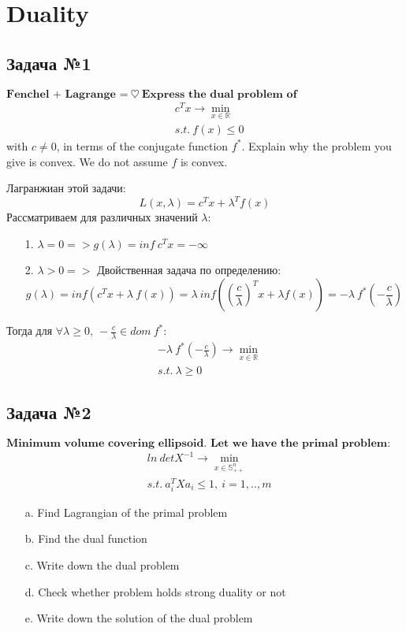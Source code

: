 \documentclass[12pt,letterpaper]{article}
\begin{document}
\newpage
\section{Duality}
\subsection*{Задача №1}
$\textbf{Fenchel + Lagrange =}\  \heartsuit\ \textbf{Express the dual problem of}$ 
$$\begin{aligned}
&c^Tx \rightarrow \min _{x \in \mathbb{R}} \\
&s.t.\ f(x) \leq 0
\end{aligned} $$
with \(c \neq 0\), in terms of the conjugate function \(f^*\). Explain why the problem you give is convex. We do not assume \(f\) is convex.

Лагранжиан этой задачи:
$$L(x,\lambda)=c^Tx+{\lambda}^Tf(x)$$
Рассматриваем для различных значений $\lambda:$
\begin{itemize}
	\item[1.] $\lambda=0 => g(\lambda)=inf\ c^Tx=-\infty$
	\item[2.] $\lambda>0 =>$ Двойственная задача по определению: 
	$$g(\lambda)=inf(c^Tx+\lambda\ f(x))=\lambda\ inf ({(\frac{c}{\lambda})}^Tx+\lambda f(x))=-\lambda\ f^*(-\frac{c}{\lambda})$$
\end{itemize}
Тогда для $\forall\lambda\geqslant0,\ -\frac{c}{\lambda}\in dom\ f^*:$
$$\begin{aligned}
&-\lambda\ f^*(-\frac{c}{\lambda}) \rightarrow \min _{x \in \mathbb{R}} \\
&s.t.\ \lambda\geqslant0
\end{aligned} $$

\subsection*{Задача №2}
$\textbf{Minimum volume covering ellipsoid. Let we have the primal problem:}$
$$\begin{aligned}
&ln\ detX^{-1} \rightarrow \min _{x \in \mathbb{S}^n_{++}} \\
&s.t.\ a^T_iXa_i \leq 1,\ i=1,..,m
\end{aligned} $$
\begin{itemize}
	\item[a.] Find Lagrangian of the primal problem
	\item[b.] Find the dual function
	\item[c.] Write down the dual problem
	\item[d.] Check whether problem holds strong duality or not
	\item[e.] Write down the solution of the dual problem
\end{itemize}
\end{document}
